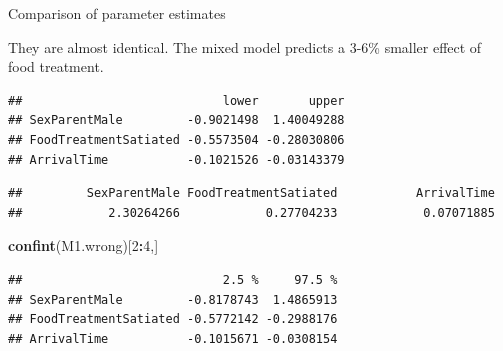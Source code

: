 \documentclass[
  ignorenonframetext,
]{beamer}
\newenvironment{Shaded}{\begin{snugshade}}{\end{snugshade}}
\newcommand{\DecValTok}[1]{\textcolor[rgb]{0.00,0.00,0.81}{#1}}
\newcommand{\KeywordTok}[1]{\textcolor[rgb]{0.13,0.29,0.53}{\textbf{#1}}}
\newcommand{\NormalTok}[1]{#1}
\newcommand{\OperatorTok}[1]{\textcolor[rgb]{0.81,0.36,0.00}{\textbf{#1}}}
\begin{document}
\begin{frame}[fragile]{Comparison of parameter estimates}
\protect\hypertarget{comparison-of-parameter-estimates}{}

They are almost identical. The mixed model predicts a 3-6\% smaller
effect of food treatment.

\scriptsize

\begin{Shaded}
\end{Shaded}

\begin{verbatim}
##                            lower       upper
## SexParentMale         -0.9021498  1.40049288
## FoodTreatmentSatiated -0.5573504 -0.28030806
## ArrivalTime           -0.1021526 -0.03143379
\end{verbatim}

\begin{Shaded}
\end{Shaded}

\begin{verbatim}
##         SexParentMale FoodTreatmentSatiated           ArrivalTime 
##            2.30264266            0.27704233            0.07071885
\end{verbatim}

\begin{Shaded}
\begin{Highlighting}[]
\KeywordTok{confint}\NormalTok{(M1.wrong)[}\DecValTok{2}\OperatorTok{:}\DecValTok{4}\NormalTok{,]}
\end{Highlighting}
\end{Shaded}

\begin{verbatim}
##                            2.5 %     97.5 %
## SexParentMale         -0.8178743  1.4865913
## FoodTreatmentSatiated -0.5772142 -0.2988176
## ArrivalTime           -0.1015671 -0.0308154
\end{verbatim}


\end{frame}
\end{document}
